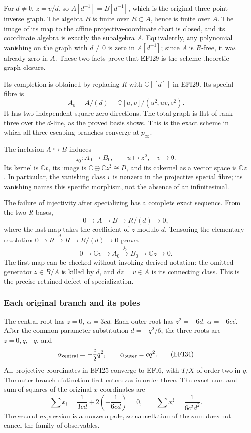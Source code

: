 \documentclass[
  10pt,
  a4paper,
]{article}
\begin{document}
For \(d\ne0\), \(z=v/d\), so \(A[d^{-1}]=B[d^{-1}]\), which is the
original three-point inverse graph. The algebra \(B\) is finite over
\(R\subset A\), hence is finite over \(A\). The image of its map to the
affine projective-coordinate chart is closed, and its coordinate algebra
is exactly the subalgebra \(A\). Equivalently, any polynomial vanishing
on the graph with \(d\ne0\) is zero in \(A[d^{-1}]\); since \(A\) is
\(R\)-free, it was already zero in \(A\). These two facts prove that
EFI29 is the scheme-theoretic graph closure.

Its completion is obtained by replacing \(R\) with \(\mathbb C[[d]]\) in
EFI29. Its special fibre is \[
A_0=A/(d)=\mathbb C[u,v]/(u^2,uv,v^2).
\tag{EFI30}
\] It has two independent square-zero directions. The total graph is
flat of rank three over the \(d\)-line, as the proved basis shows. This
is the exact scheme in which all three escaping branches converge at
\(p_\infty\).

The inclusion \(A\hookrightarrow B\) induces \[
j_0:A_0\longrightarrow B_0,\qquad
u\longmapsto z^2,\quad v\longmapsto0.
\tag{EFI31}
\] Its kernel is \(\mathbb C v\), its image is
\(\mathbb C\oplus\mathbb C z^2\cong D\), and its cokernel as a vector
space is \(\mathbb C z\). In particular, the vanishing class \(v\) is
nonzero in the projective special fibre; its vanishing names this
specific morphism, not the absence of an infinitesimal.

The failure of injectivity after specializing has a complete exact
sequence. From the two \(R\)-bases, \[
0\longrightarrow A\longrightarrow B\longrightarrow R/(d)
\longrightarrow0,
\tag{EFI32}
\] where the last map takes the coefficient of \(z\) modulo \(d\).
Tensoring the elementary resolution
\(0\to R\xrightarrow{d}R\to R/(d)\to0\) proves \[
0\longrightarrow\mathbb C v\longrightarrow A_0
\xrightarrow{j_0}B_0\longrightarrow\mathbb C z\longrightarrow0.
\tag{EFI33}
\] The first map can be checked without invoking derived notation: the
omitted generator \(z\in B/A\) is killed by \(d\), and \(dz=v\in A\) is
its connecting class. This is the precise retained defect of
specialization.

\subsubsection{Each original branch and its
poles}\label{each-original-branch-and-its-poles}

The central root has \(z=0,\ \alpha=3cd\). Each outer root has
\(z^2=-6d,\ \alpha=-6cd\). After the common parameter substitution
\(d=-q^2/6\), the three roots are \(z=0,q,-q\), and \[
\alpha_{\rm central}=-\frac c2q^2,
\qquad \alpha_{\rm outer}=cq^2.
\tag{EFI34}
\] All projective coordinates in EFI25 converge to EFI6, with \(T/X\) of
order two in \(q\). The outer branch distinction first enters
\(\alpha z\) in order three. The exact sum and sum of squares of the
original \(x\)-coordinates are \[
\sum x_i=\frac1{3cd}+2\left(-\frac1{6cd}\right)=0,
\qquad
\sum x_i^2=\frac1{6c^2d^2}.
\tag{EFI35}
\] The second expression is a nonzero pole, so cancellation of the sum
does not cancel the family of observables.
\end{document}
